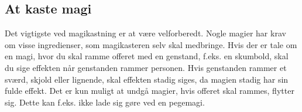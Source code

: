 \subsection{At kaste magi}
Det vigtigste ved magikastning er at være velforberedt. Nogle magier har krav om visse ingredienser, som magikasteren selv skal medbringe. Hvis der er tale om en magi, hvor du skal ramme offeret med en genstand, f.eks. en skumbold, skal du sige effekten når genstanden rammer personen. Hvis genstanden rammer et sværd, skjold eller lignende, skal effekten stadig siges, da magien stadig har sin fulde effekt. Det er kun muligt at undgå magier, hvis offeret skal rammes, flytter sig. Dette kan f.eks. ikke lade sig gøre ved en pegemagi.
